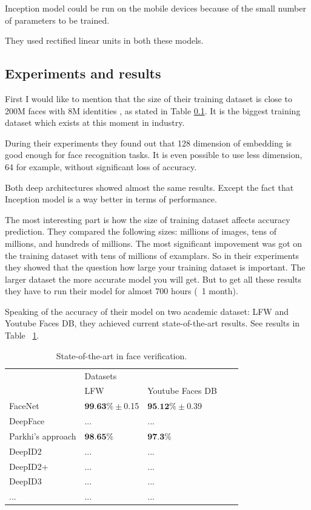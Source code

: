 \documentclass[paper=a4, fontsize=11pt]{scrartcl} %
\numberwithin{equation}{section} %
\numberwithin{figure}{section} %
\numberwithin{table}{section} %
\begin{document}
Inception model could be run on the mobile devices because of the small number of parameters to be trained. \par
They used rectified linear units in both these models.

\subsection{Experiments and results}
First I would like to mention that the size of their training dataset is close to 200M faces with 8M identities \cite{schroff2015facenet}, as stated in Table \ref{}. It is the biggest training dataset which exists at this moment in industry. \par
During their experiments they found out that 128 dimension of embedding is good enough for face recognition tasks. It is even possible to use less dimension, 64 for example, without significant loss of accuracy. \par
Both deep architectures showed almost the same results. Except the fact that Inception model is a way better in terms of performance. \par
The most interesting part is how the size of training dataset affects accuracy prediction. They compared the following sizes: millions of images, tens of millions, and hundreds of millions. The most significant impovement was got on the training dataset with tens of millions of examplars. So in their experiments they showed that the question how large your training dataset is important. The larger dataset the more accurate model you will get. But to get all these results they have to run their model for almost 700 hours (~1 month).  \par

Speaking of the accuracy of their model on two academic dataset: LFW and Youtube Faces DB, they achieved current state-of-the-art results. See results in Table ~\ref{tab:table2}.

\begin{table}[!htb]
\centering
\begin{tabular}{|l|l|l|l|l|}
\hline
\multirow{2}{*}{} Models & \multicolumn{2}{l|}{Datasets} \\ \cline{2-3} 
                  &   LFW  &  Youtube Faces DB        \\ \hline
               FaceNet   &  $\textbf{99.63}\% \pm$0.15   &   $\textbf{95.12}\% \pm$0.39       \\ \hline
               DeepFace &  ...   &  ...       \\ \hline
               Parkhi's approach		& $\textbf{98.65}\%$	 & $\textbf{97.3}\%$ \\ \hline
               DeepID2 &  ...   &  ...       \\ \hline
               DeepID2+ &  ...   &  ...       \\ \hline
               DeepID3 &  ...   &  ...       \\ \hline
               ... & ... & ... \\ \hline
\end{tabular}
\caption{State-of-the-art in face verification.}
\label{tab:table2}
\end{table}
\end{document}
